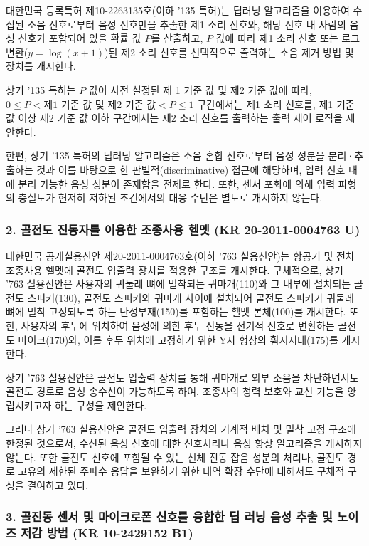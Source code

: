 \documentclass{article}
\begin{document}
대한민국 등록특허 제10-2263135호(이하 '135 특허)는 딥러닝 알고리즘을 이용하여 수집된 소음 신호로부터 음성 신호만을 추출한 제1 소리 신호와, 해당 신호 내 사람의 음성 신호가 포함되어 있을 확률 값 $P$를 산출하고, $P$ 값에 따라 제1 소리 신호 또는 로그 변환($y = \log(x + 1)$)된 제2 소리 신호를 선택적으로 출력하는 소음 제거 방법 및 장치를 개시한다.

상기 '135 특허는 $P$ 값이 사전 설정된 제 1 기준 값 및 제2 기준 값에 따라, $0 \le P < \text{제1 기준 값}$ 및 $\text{제2 기준 값} < P \le 1$ 구간에서는 제1 소리 신호를, 제1 기준 값 이상 제2 기준 값 이하 구간에서는 제2 소리 신호를 출력하는 출력 제어 로직을 제안한다.

한편, 상기 '135 특허의 딥러닝 알고리즘은 소음 혼합 신호로부터 음성 성분을 분리·추출하는 것과 이를 바탕으로 한 판별적(discriminative) 접근에 해당하며, 입력 신호 내에 분리 가능한 음성 성분이 존재함을 전제로 한다. 
또한, 센서 포화에 의해 입력 파형의 충실도가 현저히 저하된 조건에서의 대응 수단은 별도로 개시하지 않는다.

\subsubsection*{2. 골전도 진동자를 이용한 조종사용 헬멧 (KR 20-2011-0004763 U)}

대한민국 공개실용신안 제20-2011-0004763호(이하 '763 실용신안)는 항공기 및 전차 조종사용 헬멧에 골전도 입출력 장치를 적용한 구조를 개시한다.
구체적으로, 상기 '763 실용신안은 사용자의 귀둘레 뼈에 밀착되는 귀마개(110)와 그 내부에 설치되는 골전도 스피커(130), 골전도 스피커와 귀마개 사이에 설치되어 골전도 스피커가 귀둘레 뼈에 밀착 고정되도록 하는 탄성부재(150)를 포함하는 헬멧 본체(100)를 개시한다.
또한, 사용자의 후두에 위치하여 음성에 의한 후두 진동을 전기적 신호로 변환하는 골전도 마이크(170)와, 이를 후두 위치에 고정하기 위한 Y자 형상의 휨지지대(175)를 개시한다.

상기 '763 실용신안은 골전도 입출력 장치를 통해 귀마개로 외부 소음을 차단하면서도 골전도 경로로 음성 송수신이 가능하도록 하여, 조종사의 청력 보호와 교신 기능을 양립시키고자 하는 구성을 제안한다.

그러나 상기 '763 실용신안은 골전도 입출력 장치의 기계적 배치 및 밀착 고정 구조에 한정된 것으로서, 수신된 음성 신호에 대한 신호처리나 음성 향상 알고리즘을 개시하지 않는다. 또한 골전도 신호에 포함될 수 있는 신체 진동 잡음 성분의 처리나, 골전도 경로 고유의 제한된 주파수 응답을 보완하기 위한 대역 확장 수단에 대해서도 구체적 구성을 결여하고 있다.



\subsubsection*{3. 골진동 센서 및 마이크로폰 신호를 융합한 딥 러닝 음성 추출 및 노이즈 저감 방법 (KR 10-2429152 B1)}
\end{document}
